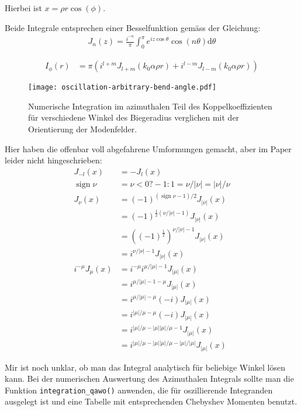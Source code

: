 \documentclass[DIV19,twocolumn]{scrartcl}
\def\({\left(}
\def\){\right)}
\DeclareMathOperator{\sign}{sign}
\begin{document}
Hierbei ist $x=\rho r \cos(\phi)$.

Beide Integrale entsprechen einer Besselfunktion gem\"ass der
Gleichung:
\begin{align}
  J_n(z) = \frac{i^{-n}}{\pi}\int_0^\pi e^{iz\cos\theta} \cos(n \theta) \textrm{d} \theta
\end{align}

\begin{align}
  I_\phi(r) &= \pi \(i^{l+m} J_{l+m}(k_0\alpha\rho r)+i^{l-m} J_{l-m}(k_0\alpha\rho r)\)
\end{align}

\begin{figure}[!hbt]
  \centering
  \texttt{[image: oscillation-arbitrary-bend-angle.pdf]}
  \caption{Numerische Integration im azimuthalen Teil des
    Koppelkoeffizienten f\"ur verschiedene Winkel des Biegeradius
    verglichen mit der Orientierung der Modenfelder.}
  \label{fig:besselint}
\end{figure}


Hier haben die offenbar voll abgefahrene Umformungen gemacht, aber im
Paper leider nicht hingeschrieben:
\begin{align}
J_{-l}(x) &= -J_l(x) \\
\sign \nu &= \nu<0 ? -1 : 1 = \nu/|\nu| = |\nu|/\nu \\
J_\nu(x) &= (-1)^{(\sign{\nu}-1)/2} J_{|\nu|}(x) \\ 
& = (-1)^{\frac{1}{2}(\nu/|\nu|-1)} J_{|\nu|}(x) \\ 
& = ((-1)^{\frac{1}{2}})^{\nu/|\nu|-1} J_{|\nu|}(x) \\ 
& = i^{\nu/|\nu|-1} J_{|\nu|}(x)\\
i^{-\mu} J_\mu(x) &= i^{-\mu} i^{\mu/|\mu|-1} J_{|\mu|}(x)\\
&= i^{\mu/|\mu|-1 -\mu } J_{|\mu|}(x) \\
&= i^{\mu/|\mu| -\mu } (-i) J_{|\mu|}(x) \\
&= i^{|\mu|/\mu-\mu} (-i) J_{|\mu|}(x) \\
&= i^{|\mu|/\mu-|\mu| |\mu| /\mu-1} J_{|\mu|}(x) \\
&= i^{|\mu|/\mu-|\mu| |\mu| /\mu-|\mu|/|\mu|} J_{|\mu|}(x)
\end{align}


Mir ist noch unklar, ob man das Integral analytisch f\"ur beliebige
Winkel l\"osen kann.  Bei der numerischen Auswertung des Azimuthalen
Integrals sollte man die Funktion \verb!integration_qawo()! anwenden,
die f\"ur oszillierende Integranden ausgelegt ist und eine Tabelle mit
entsprechenden Chebyshev Momenten benutzt.
\end{document}
